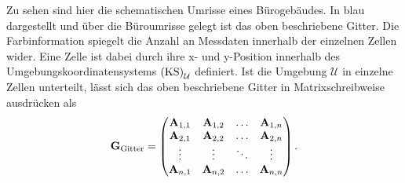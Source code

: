 Zu sehen sind hier die schematischen Umrisse eines Bürogebäudes. In blau dargestellt und über die Büroumrisse gelegt ist das oben beschriebene Gitter. Die Farbinformation spiegelt die Anzahl an Messdaten innerhalb der einzelnen Zellen wider. Eine Zelle ist dabei durch ihre x- und y-Position innerhalb des Umgebungskoordinatensystems $\textrm{(KS)}_{\mathrm{\mathcal{U}}}$ definiert. 
Ist die Umgebung $\mathcal{U}$ in einzelne Zellen unterteilt, lässt sich das oben beschriebene Gitter in Matrixschreibweise ausdrücken als
\begin{equation}
	\mathbf{G_{\mathrm{Gitter}}} = \begin{pmatrix}
		\mathbf{A}_{1,1} & \mathbf{A}_{1,2} &\hdots & \mathbf{A}_{1,n} \\
		\mathbf{A}_{2,1} & \mathbf{A}_{2,2} & \hdots & \mathbf{A}_{2,n} \\
		\vdots & \vdots & \ddots & \vdots \\
		\mathbf{A}_{n,1} & \mathbf{A}_{n,2} & \hdots & \mathbf{A}_{n,n}
	\end{pmatrix} .
\label{eq:Umgebungsmatrix}
\end{equation}

